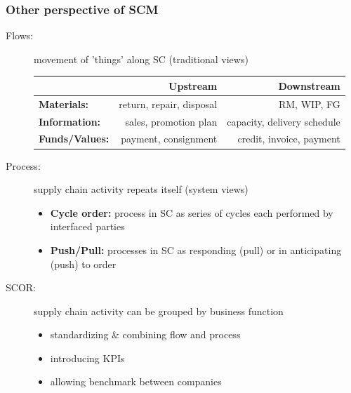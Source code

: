 \documentclass[10pt,handout,notes=show]{beamer}
\begin{document}
\begin{frame}
  \frametitle{Other perspective of SCM}

    \begin{description}
      \item[Flows:] movement of 'things' along SC (traditional views)
      \begin{minipage}{0.8\textwidth} \small{
        \begin{tabular}{l|rr} \hline
                                    & Upstream  & Downstream \\ \hline
        \textbf{Materials:}   & return, repair, disposal&  RM, WIP, FG   \\
        \textbf{Information:} & sales, promotion plan   &  capacity, delivery schedule \\
        \textbf{Funds/Values:}& payment, consignment    & credit, invoice, payment\\ \hline
        \end{tabular} }
      \end{minipage} \NextHalfLine
      \item[Process:] supply chain activity repeats itself (system views)
      \begin{itemize}
        \item \textbf{Cycle order:} process in SC as series of cycles each performed by interfaced parties
        \item \textbf{Push/Pull:} processes in SC as responding (\alert{pull}) or in anticipating (\alert{push}) to order \NextHalfLine
      \end{itemize}
      \item[SCOR:] supply chain activity can be grouped by business function
       \begin{itemize}
        \item standardizing \& combining flow and process
        \item introducing KPIs
        \item allowing benchmark between companies
       \end{itemize}
    \end{description}


\end{frame}
\end{document}
